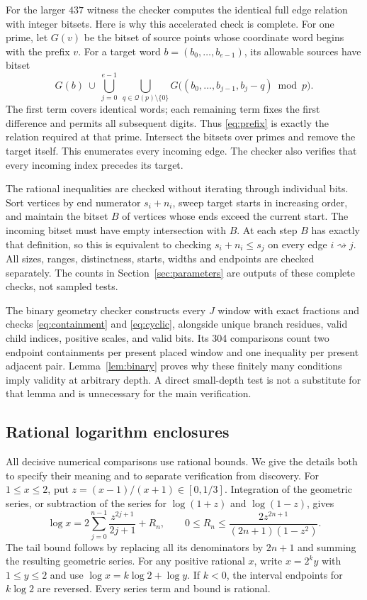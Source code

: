 \documentclass[11pt]{article}
\theoremstyle{definition}
\theoremstyle{remark}
\newcommand{\QR}{\mathcal Q}
\begin{document}
For the larger $437$ witness the checker computes the identical full edge
relation with integer bitsets. Here is why this accelerated check is
complete. For one prime, let $G(v)$ be the bitset of source points whose
coordinate word begins with the prefix $v$. For a target word
$b=(b_0,\ldots,b_{e-1})$, its allowable sources have bitset
\begin{equation}\label{eq:prefix}
 G(b)\ \cup\ \bigcup_{j=0}^{e-1}\ \bigcup_{q\in\QR(p)\setminus\{0\}}
 G\bigl((b_0,\ldots,b_{j-1},b_j-q)\bmod p\bigr).
\end{equation}
The first term covers identical words; each remaining term fixes the first
difference and permits all subsequent digits. Thus \eqref{eq:prefix} is
exactly the relation required at that prime. Intersect the bitsets over
primes and remove the target itself. This enumerates every incoming edge.
The checker also verifies that every incoming index precedes its target.

The rational inequalities are checked without iterating through individual
bits. Sort vertices by end numerator $s_i+n_i$, sweep target starts in
increasing order, and maintain the bitset $B$ of vertices whose ends exceed
the current start. The incoming bitset must have empty intersection with
$B$. At each step $B$ has exactly that definition, so this is equivalent
to checking $s_i+n_i\le s_j$ on every edge $i\rightsquigarrow j$.
All sizes, ranges, distinctness, starts, widths and endpoints are checked
separately. The counts in Section~\ref{sec:parameters} are outputs of
these complete checks, not sampled tests.

The binary geometry checker constructs every $J$ window with exact
fractions and checks \eqref{eq:containment} and \eqref{eq:cyclic}, alongside
unique branch residues, valid child indices, positive scales, and valid
bits. Its 304 comparisons count two endpoint containments per present
placed window and one inequality per present adjacent pair.
Lemma~\ref{lem:binary} proves why these finitely many conditions imply
validity at arbitrary depth. A direct small-depth test is not a substitute
for that lemma and is unnecessary for the main verification.

\subsection{Rational logarithm enclosures}\label{sec:arithmetic}
All decisive numerical comparisons use rational bounds. We give the details
both to specify their meaning and to separate verification from discovery.
For $1\le x\le2$, put $z=(x-1)/(x+1)\in[0,1/3]$. Integration of the
geometric series, or subtraction of the series for $\log(1+z)$ and
$\log(1-z)$, gives
\begin{equation}\label{eq:logseries}
 \log x=2\sum_{j=0}^{n-1}\frac{z^{2j+1}}{2j+1}+R_n,
 \qquad 0\le R_n\le
 \frac{2z^{2n+1}}{(2n+1)(1-z^2)}.
\end{equation}
The tail bound follows by replacing all its denominators by $2n+1$ and
summing the resulting geometric series. For any positive rational $x$,
write $x=2^k y$ with $1\le y\le2$ and use
$\log x=k\log2+\log y$. If $k<0$, the interval endpoints for $k\log2$
are reversed. Every series term and bound is rational.
\end{document}
